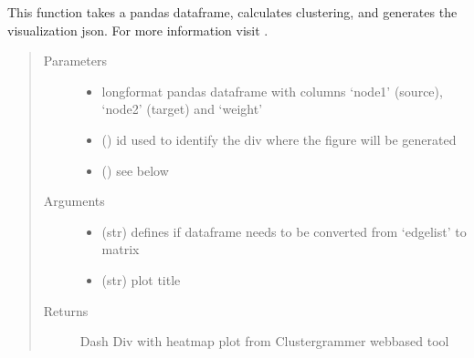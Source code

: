 \documentclass[letterpaper,10pt,english]{sphinxmanual}
\begin{document}
\begin{fulllineitems}
\label{\detokenize{_autosummary/analytics_core.viz:analytics_core.viz.viz.get_clustergrammer_plot}}
This function takes a pandas dataframe, calculates clustering, and generates the visualization json.
For more information visit .
\begin{quote}\begin{description}
\item[{Parameters}] \leavevmode\begin{itemize}
\item {} 
 \textendash{} long\sphinxhyphen{}format pandas dataframe with columns ‘node1’ (source), ‘node2’ (target) and ‘weight’

\item {} 
 () \textendash{} id used to identify the div where the figure will be generated

\item {} 
 () \textendash{} see below

\end{itemize}

\item[{Arguments}] \leavevmode\begin{itemize}
\item {} 
 (str) \textendash{} defines if dataframe needs to be converted from ‘edgelist’ to matrix

\item {} 
 (str) \textendash{} plot title

\end{itemize}

\item[{Returns}] \leavevmode
Dash Div with heatmap plot from Clustergrammer web\sphinxhyphen{}based tool

\end{description}\end{quote}

\end{fulllineitems}
\end{document}
